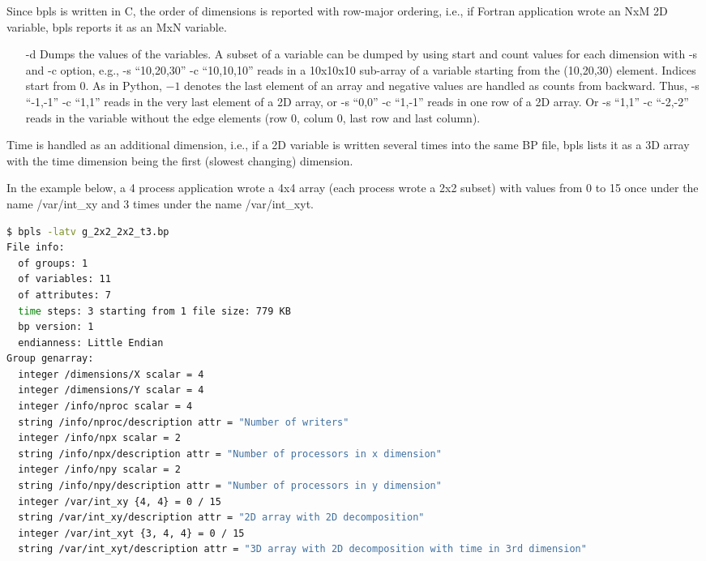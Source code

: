 Since bpls is written in C, the order of dimensions is reported with row-major 
ordering, i.e., if Fortran application wrote an NxM 2D variable, bpls reports it 
as an MxN variable. 

\begin{itemize}
\item[-d] Dumps the values of the variables. A subset of a variable can be dumped by using 
start and count values for each dimension with -s and -c option, e.g., -s ``10,20,30'' 
-c ``10,10,10'' reads in a 10x10x10 sub-array of a variable starting from the (10,20,30) 
element. Indices start from 0. As in Python, $-1$ denotes the last element of 
an array and negative values are handled as counts from backward. Thus, -s ``-1,-1'' 
-c ``1,1'' reads in the very last element of a 2D array, or -s ``0,0'' -c ``1,-1'' 
reads in one row of a 2D array. Or -s ``1,1'' -c ``-2,-2'' reads in the variable 
without the edge elements (row 0, colum 0, last row and last column).
\end{itemize}

Time is handled as an additional dimension, i.e., if a 2D variable is written several 
times into the same BP file, bpls lists it as a 3D array with the time dimension 
being the first (slowest changing) dimension. 

In the example below, a 4 process application wrote a 4x4 array (each process wrote 
a 2x2 subset) with values from 0 to 15 once under the name /var/int\_xy and 3 times 
under the name /var/int\_xyt. 

\begin{lstlisting}[language=bash,caption={bpls utility},label={}]
$ bpls -latv g_2x2_2x2_t3.bp 
File info:
  of groups: 1
  of variables: 11
  of attributes: 7
  time steps: 3 starting from 1 file size: 779 KB
  bp version: 1
  endianness: Little Endian
Group genarray:
  integer /dimensions/X scalar = 4
  integer /dimensions/Y scalar = 4
  integer /info/nproc scalar = 4
  string /info/nproc/description attr = "Number of writers"
  integer /info/npx scalar = 2
  string /info/npx/description attr = "Number of processors in x dimension"
  integer /info/npy scalar = 2
  string /info/npy/description attr = "Number of processors in y dimension"
  integer /var/int_xy {4, 4} = 0 / 15
  string /var/int_xy/description attr = "2D array with 2D decomposition"
  integer /var/int_xyt {3, 4, 4} = 0 / 15
  string /var/int_xyt/description attr = "3D array with 2D decomposition with time in 3rd dimension"
\end{lstlisting}


